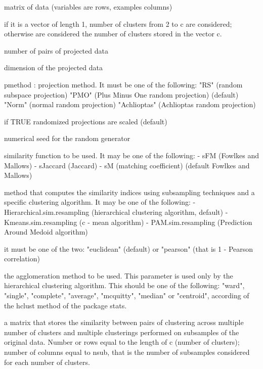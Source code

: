 \documentclass{article}
\begin{document}
\begin{Arguments}
\begin{ldescription}
\item[\code{X}] matrix of data (variables are rows, examples columns)
\item[\code{c}] if it is a vector of length 1, number of clusters from 2 to c are considered; otherwise are considered 
the number of clusters stored in the vector c. 
\item[\code{nprojections}] number of pairs of projected data 
\item[\code{dim}] dimension of the projected data 
\item[\code{pmethod}] pmethod : projection method. It must be one of the following:  
"RS" (random subspace projection)
"PMO" (Plus Minus One random projection) (default)
"Norm" (normal random projection)
"Achlioptas" (Achlioptas random projection)
\item[\code{scale}] if TRUE randomized projections are scaled (default) 
\item[\code{seed}] numerical seed for the random generator 
\item[\code{s}] similarity function to be used. It may be one of the following: 
- sFM (Fowlkes and Mallows)
- sJaccard (Jaccard)
- sM (matching coefficient)
(default Fowlkes and Mallows)
\item[\code{alg.clust.sim}] method that computes the similarity indices using subsampling techniques and a specific clustering algorithm. 
It may be one of the following: 
- Hierarchical.sim.resampling (hierarchical clustering algorithm, default)
- Kmeans.sim.resampling (c - mean algorithm)
- PAM.sim.resampling (Prediction Around Medoid algorithm)
\item[\code{distance}] it must be one of the two: "euclidean" (default) or "pearson" (that is 1 - Pearson correlation) 
\item[\code{hmethod}] the agglomeration method to be used. This parameter is used only by the hierarchical clustering algorithm.
This should be one of the following:
"ward", "single", "complete", "average", "mcquitty", "median" or "centroid", according of the hclust
method of the package stats. 
\end{ldescription}
\end{Arguments}
\begin{Value}
a matrix that stores the similarity between pairs of clustering across multiple number of clusters
and multiple clusterings performed on subsamples of the original data.
Number or rows equal to the length of c (number of clusters); number of columns      
equal to nsub, that is the number of subsamples considered for each number of clusters.
\end{Value}
\end{document}
